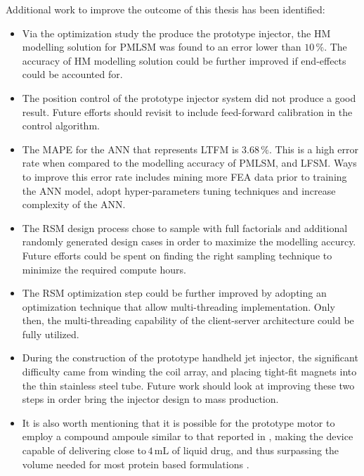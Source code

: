     Additional work to improve the outcome of this thesis has been identified:
    
    \begin{itemize}
        \item Via the optimization study the produce the prototype injector, the \acs{HM} modelling solution for \acs{PMLSM} was found to an error lower than $10\,\%$. The accuracy of \acs{HM} modelling solution could be further improved if end-effects could be accounted for.
        \item The position control of the prototype injector system did not produce a good result. Future efforts should revisit to include feed-forward calibration in the control algorithm. 
        \item The \acf{MAPE} for the \acs{ANN} that represents \acs{LTFM} is $3.68\,\%$. This is a high error rate when compared to the modelling accuracy of \acs{PMLSM}, and \acs{LFSM}. Ways to improve this error rate includes mining more \acf{FEA} data prior to training the \acs{ANN} model, adopt hyper-parameters tuning techniques and increase complexity of the \acs{ANN}.
        \item The \acs{RSM} design process chose to sample with full factorials and additional randomly generated design cases in order to maximize the modelling accurcy. Future efforts could be spent on finding the right sampling technique to minimize the required compute hours.
        \item The \acs{RSM} optimization step could be further improved by adopting an optimization technique that allow multi-threading implementation. Only then, the multi-threading capability of the client-server architecture could be fully utilized.   
        \item During the construction of the prototype handheld jet injector, the significant difficulty came from winding the coil array, and placing tight-fit magnets into the thin stainless steel tube. Future work should look at improving these two steps in order bring the injector design to mass production.
        \item It is also worth mentioning that it is possible for the prototype motor to employ a compound ampoule similar to that reported in \cite{Ruddy2015a,McKeage2018}, making the device capable of delivering close to\,$4\,\mathrm{mL}$ of liquid drug, and thus surpassing the volume needed for most protein based formulations \cite{Hogan2015}.
    \end{itemize}



